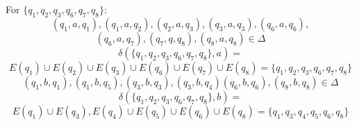 \documentclass[12pt]{article}
\begin{document}
For $\{q_1, q_2, q_3, q_6, q_7, q_8\}$:
\begin{equation*}
(q_1, a, q_1), (q_1, a, q_2), (q_2, a, q_3), (q_3, a, q_3), (q_6, a, q_6), 
\end{equation*}
\begin{equation*}
	(q_6, a, q_7), (q_7, q, q_8), (q_8, a, q_8) \in \Delta
\end{equation*}
\begin{equation*}
	\delta (\{q_1, q_2, q_3, q_6, q_7, q_8\}, a) = 
\end{equation*}
\begin{equation*}
	E(q_1) \cup E(q_2) \cup E(q_3) \cup E(q_6) \cup E(q_7) \cup E(q_8) = \{q_1, q_2, q_3, q_6, q_7, q_8\}
\end{equation*}
\begin{equation*}
	(q_1, b, q_1), (q_1, b, q_5), (q_3, b, q_3), (q_3, b, q_4) (q_6, b, q_6), (q_8, b, q_8) \in \Delta
\end{equation*}
\begin{equation*}
	\delta (\{q_1, q_2, q_3, q_6, q_7, q_8\}, b) = 
\end{equation*}
\begin{equation*}
	E(q_1) \cup E(q_3), E(q_4) \cup E(q_5) \cup E(q_6) \cup E(q_8) = \{q_1, q_3, q_4, q_5, q_6, q_8\}
\end{equation*}
\end{document}
